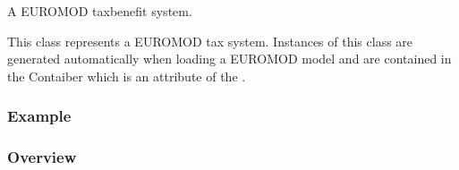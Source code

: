 \documentclass[letterpaper,10pt,english]{sphinxmanual}
\begin{document}
\begin{fulllineitems}
\label{\detokenize{autoapi/euromod/core/index:euromod.core.System}}
\pysigstartsignatures
{}
\pysigstopsignatures
\sphinxAtStartPar
A EUROMOD tax\sphinxhyphen{}benefit system.

\sphinxAtStartPar
This class represents a EUROMOD tax system.
Instances of this class are generated automatically when loading a EUROMOD model and are contained in the
 Contaiber which is an attribute of the {\hyperref[\detokenize{autoapi/euromod/core/index:euromod.core.Country}]{}}.
\subsubsection*{Example}

\begin{sphinxVerbatim}[commandchars=\\\{\}]
   
\PYG{p}{[}\PYG{p}{]}\PYG{p}{[}\PYG{p}{]}
\end{sphinxVerbatim}
\subsubsection*{Overview}



\end{fulllineitems}
\end{document}
